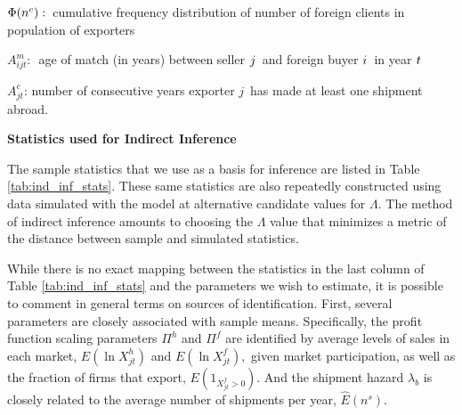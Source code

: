 \begin{table}[tbp]
{${\small \Phi }{\small (n^{c})}:${\small \ cumulative frequency distribution of number of foreign clients in population of exporters }

$A_{ijt}^{m}:${\small \ age of match (in years) between seller }${\small j}${\small \ and foreign buyer }${\small i}${\small \ in year }${\small t} ${\small \ }

$A_{jt}^{c}${\small : number of consecutive years exporter }$j${\small \ has
made at least one shipment abroad.}
}%
\caption{\textbf{Statistics used for Indirect Inference}}
\label{tab:ind_inf_stats}
\end{table}%

The sample statistics that we use as a basis for inference are listed in
Table \ref{tab:ind_inf_stats}. These same statistics are also repeatedly constructed using data
simulated with the model at alternative candidate values for $\Lambda $. The
method of indirect inference amounts to choosing the $\Lambda $ value that
minimizes a metric of the distance between sample and simulated 
statistics.\footnotemark{}


While there is no exact mapping between the statistics in the last column of
Table \ref{tab:ind_inf_stats} and the parameters we wish to estimate, it is possible to comment in
general terms on sources of identification. First, several parameters are
closely associated with sample means. Specifically, the profit function
scaling parameters $\Pi ^{h}$ and $\Pi ^{f}$ are identified by average
levels of sales in each market, $E(\ln X_{jt}^{h})$ and $E(\ln X_{jt}^{f}),$
given market participation, as well as the fraction of firms that export, $%
E(1_{X_{jt}^{f}>0})$. And the shipment hazard $\lambda _{b}$ is closely
related to the average number of shipments per year, $\widehat{E}\left(
n^{s}\right) .$

